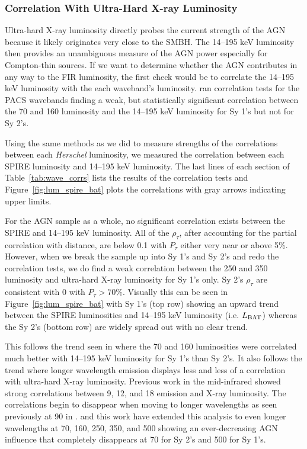 \subsubsection{Correlation With Ultra-Hard X-ray Luminosity}
Ultra-hard X-ray luminosity directly probes the current strength of the AGN because it likely originates very close to the SMBH. The 14--195 keV luminosity then provides an unambiguous measure of the AGN power especially for Compton-thin sources. If we want to determine whether the AGN contributes in any way to the FIR luminosity, the first check would be to correlate the 14--195 keV luminosity with the each waveband's luminosity. \citet{Melendez:2014yu} ran correlation tests for the PACS wavebands finding a weak, but statistically significant correlation between the 70 and 160 \um{} luminosity and the 14--195 keV luminosity for Sy 1's but not for Sy 2's.

Using the same methods as we did to measure strengths of the correlations between each \textit{Herschel} luminosity, we measured the correlation between each SPIRE luminosity and 14--195 keV luminosity. The last lines of each section of Table~\ref{tab:wave_corrs} lists the results of the correlation tests and Figure~\ref{fig:lum_spire_bat} plots the correlations with gray arrows indicating upper limits.

For the AGN sample as a whole, no significant correlation exists between the SPIRE and 14--195 keV luminosity. All of the $\rho_{\tau}$, after accounting for the partial correlation with distance, are below 0.1 with $P_{\tau}$ either very near or above 5\%. However, when we break the sample up into Sy 1's and Sy 2's and redo the correlation tests, we do find a weak correlation between the 250 and 350 \um{} luminosity and ultra-hard X-ray luminosity for Sy 1's only. Sy 2's $\rho_{\tau}$ are consistent with 0 with $P_{\tau}>70\%$. Visually this can be seen in Figure~\ref{fig:lum_spire_bat} with Sy 1's (top row) showing an upward trend between the SPIRE luminosities and 14--195 keV luminosity (i.e. $L_{\rm BAT}$) whereas the Sy 2's (bottom row) are widely spread out with no clear trend. 

This follows the trend seen in \citet{Melendez:2014yu} where the 70 and 160 \um{} luminosities were correlated much better with 14--195 keV luminosity for Sy 1's than Sy 2's. It also follows the trend where longer wavelength emission displays less and less of a correlation with ultra-hard X-ray luminosity. Previous work in the mid-infrared showed strong correlations between 9, 12, and 18 \um{} emission \citep{Gandhi:2009kx, Matsuta:2012gf, Ichikawa:2012ul} and X-ray luminosity. The correlations begin to disappear when moving to longer wavelengths as seen previously at 90 \um{} in \citet{Ichikawa:2012ul}. \citet{Melendez:2014yu} and this work have extended this analysis to even longer wavelengths at 70, 160, 250, 350, and 500 \um{} showing an ever-decreasing AGN influence that completely disappears at 70 \um{} for Sy 2's and 500 \um{} for Sy 1's.